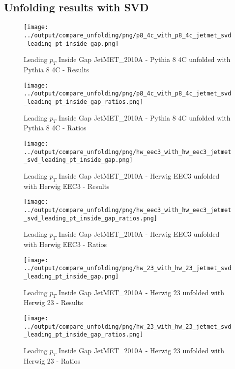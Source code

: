\documentclass[11pt]{book}
\begin{document}
\clearpage
\subsection{Unfolding results with SVD}

\begin{figure}[ht]
\centering
\texttt{[image: ../output/compare\_unfolding/png/p8\_4c\_with\_p8\_4c\_jetmet\_svd\_leading\_pt\_inside\_gap.png]}
\caption{Leading $p_{T}$ Inside Gap JetMET\_2010A - Pythia 8 4C unfolded with Pythia 8 4C - Results}
\label{p8_p8_jetmet_svd_leading_pt_inside_gap_a}
\end{figure}

\begin{figure}[ht]
\centering
\texttt{[image: ../output/compare\_unfolding/png/p8\_4c\_with\_p8\_4c\_jetmet\_svd\_leading\_pt\_inside\_gap\_ratios.png]}
\caption{Leading $p_{T}$ Inside Gap JetMET\_2010A - Pythia 8 4C unfolded with Pythia 8 4C - Ratios}
\label{p8_p8_jetmet_svd_leading_pt_inside_gap_b}
\end{figure}

\begin{figure}[ht]
\centering
\texttt{[image: ../output/compare\_unfolding/png/hw\_eec3\_with\_hw\_eec3\_jetmet\_svd\_leading\_pt\_inside\_gap.png]}
\caption{Leading $p_{T}$ Inside Gap JetMET\_2010A - Herwig EEC3 unfolded with Herwig EEC3 - Results}
\label{hw_eec3_hw_eec3_jetmet_svd_leading_pt_inside_gap_a}
\end{figure}

\begin{figure}[ht]
\centering
\texttt{[image: ../output/compare\_unfolding/png/hw\_eec3\_with\_hw\_eec3\_jetmet\_svd\_leading\_pt\_inside\_gap\_ratios.png]}
\caption{Leading $p_{T}$ Inside Gap JetMET\_2010A - Herwig EEC3 unfolded with Herwig EEC3 - Ratios}
\label{hw_eec3_hw_eec3_jetmet_svd_leading_pt_inside_gap_b}
\end{figure}

\begin{figure}[ht]
\centering
\texttt{[image: ../output/compare\_unfolding/png/hw\_23\_with\_hw\_23\_jetmet\_svd\_leading\_pt\_inside\_gap.png]}
\caption{Leading $p_{T}$ Inside Gap JetMET\_2010A - Herwig 23 unfolded with Herwig 23 - Results}
\label{hw_23_hw_23_jetmet_svd_leading_pt_inside_gap_a}
\end{figure}

\begin{figure}[ht]
\centering
\texttt{[image: ../output/compare\_unfolding/png/hw\_23\_with\_hw\_23\_jetmet\_svd\_leading\_pt\_inside\_gap\_ratios.png]}
\caption{Leading $p_{T}$ Inside Gap JetMET\_2010A - Herwig 23 unfolded with Herwig 23 - Ratios}
\label{hw_23_hw_23_jetmet_svd_leading_pt_inside_gap_b}
\end{figure}
\end{document}
